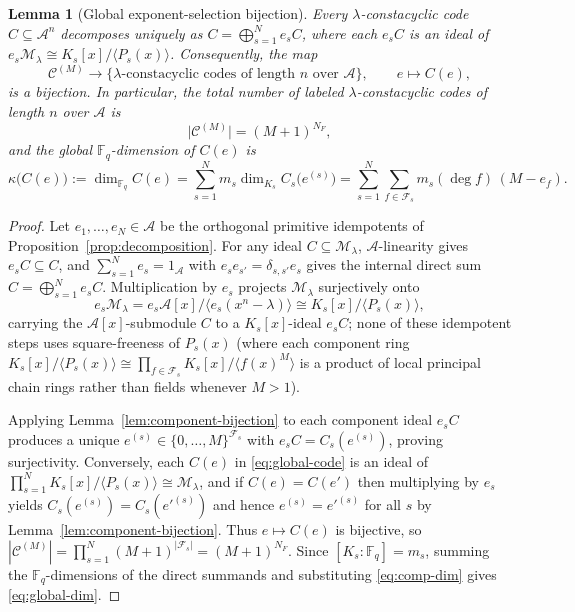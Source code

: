 \documentclass[preprint,12pt]{elsarticle}
\newcommand{\F}{\mathbb F}
\newcommand{\A}{\mathcal A}
\newcommand{\Fs}{\mathcal F_s}
\numberwithin{equation}{section}
\theoremstyle{plain}
\newtheorem{lemma}[theorem]{Lemma}
\theoremstyle{definition}
\theoremstyle{remark}
\begin{document}
\begin{lemma}[Global exponent-selection bijection]\label{lem:global-bijection}
Every $\lambda$-constacyclic code $C\subseteq\A^n$ decomposes uniquely as
$C=\bigoplus_{s=1}^{N}e_s C$, where each $e_s C$ is an ideal of
$e_s\mathcal M_\lambda\cong K_s[x]/\langle P_s(x)\rangle$. Consequently, the map
\[
\mathscr C^{(M)}\longrightarrow
\{\lambda\text{-constacyclic codes of length }n\text{ over }\A\},
\qquad
e\longmapsto C(e),
\]
is a bijection. In particular, the total number of labeled $\lambda$-constacyclic
codes of length $n$ over $\A$ is
\begin{equation}\label{eq:total-codes-setting}
\bigl|\mathscr C^{(M)}\bigr|=(M+1)^{N_F},
\end{equation}
and the global $\F_q$-dimension of $C(e)$ is
\begin{equation}\label{eq:global-dim}
\kappa\bigl(C(e)\bigr):=\dim_{\F_q}C(e)
 =\sum_{s=1}^{N}m_s\dim_{K_s}C_s\bigl(e^{(s)}\bigr)
 =\sum_{s=1}^{N}\sum_{f\in\Fs} m_s(\deg f)\,(M-e_f).
\end{equation}
\end{lemma}

\begin{proof}
Let $e_1,\dots,e_N\in\A$ be the orthogonal primitive idempotents of
Proposition~\ref{prop:decomposition}. For any ideal $C\subseteq\mathcal M_\lambda$,
$\A$-linearity gives $e_s C\subseteq C$, and $\sum_{s=1}^{N}e_s=1_\A$ with
$e_s e_{s'}=\delta_{s,s'}e_s$ gives the internal direct sum
$C=\bigoplus_{s=1}^{N}e_s C$. Multiplication by $e_s$ projects $\mathcal M_\lambda$
surjectively onto
\[
e_s\mathcal M_\lambda
 =e_s\A[x]\big/\langle e_s(x^n-\lambda)\rangle
 \cong K_s[x]/\langle P_s(x)\rangle,
\]
carrying the $\A[x]$-submodule $C$ to a $K_s[x]$-ideal $e_s C$; none of these
idempotent steps uses square-freeness of $P_s(x)$
(where each component ring
$K_s[x]/\langle P_s(x)\rangle\cong\prod_{f\in\Fs}K_s[x]/\langle f(x)^M\rangle$
is a product of local principal chain rings rather than fields whenever $M>1$).

Applying Lemma~\ref{lem:component-bijection} to each component ideal $e_s C$
produces a unique $e^{(s)}\in\{0,\dots,M\}^{\Fs}$ with $e_s C=C_s(e^{(s)})$,
proving surjectivity. Conversely, each $C(e)$ in \eqref{eq:global-code} is an
ideal of $\prod_{s=1}^{N}K_s[x]/\langle P_s(x)\rangle\cong\mathcal M_\lambda$,
and if $C(e)=C(e')$ then multiplying by $e_s$ yields
$C_s(e^{(s)})=C_s(e'^{(s)})$ and hence $e^{(s)}=e'^{(s)}$ for all $s$ by
Lemma~\ref{lem:component-bijection}. Thus $e\mapsto C(e)$ is bijective, so
$|\mathscr C^{(M)}|=\prod_{s=1}^{N}(M+1)^{|\Fs|}=(M+1)^{N_F}$. Since
$[K_s:\F_q]=m_s$, summing the $\F_q$-dimensions of the direct summands and
substituting \eqref{eq:comp-dim} gives \eqref{eq:global-dim}.
\end{proof}
\end{document}
